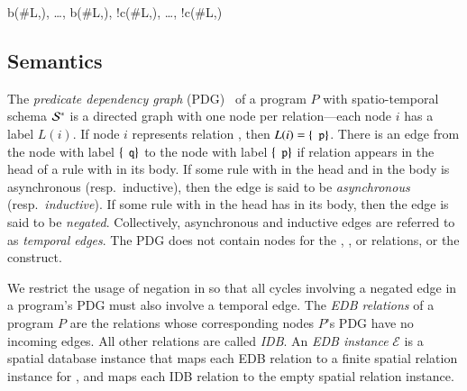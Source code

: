 \begin{Drules}
        {b(#L,), \ldots, b(#L,), !c(#L,), \ldots, !c(#L,)}
\end{Drules}





\subsection{Semantics}
\label{sec:semantics}
The {\em predicate dependency graph} (PDG)~\cite{ullmanbook} of a \lang program $P$ with spatio-temporal schema $\stschema$ is a directed graph with one node per relation---each node $i$ has a label $L(i)$.  If node $i$ represents relation , then $L(i) = \{\dedalus{p}\}$.  There is an edge from the node with label $\{\dedalus{q}\}$ to the node with label $\{\dedalus{p}\}$ if relation  appears in the head of a rule with  in its body.  If some rule with  in the head and  in the body is asynchronous (resp.\ inductive), then the edge is said to be {\em asynchronous} (resp.\ {\em inductive}).  If some rule with  in the head has  in its body, then the edge is said to be {\em negated}.  Collectively, asynchronous and inductive edges are referred to as {\em temporal edges}.  The PDG does not contain nodes for the , , or \dedalus{<} relations, or the  construct.

We restrict the usage of negation in \lang so that all cycles involving a negated edge in a \lang program's PDG must also involve a temporal edge.
The {\em EDB relations} of a \lang program $P$ are the relations whose corresponding nodes $P$'s PDG have no incoming edges.  All other relations are called {\em IDB}.
An {\em EDB instance} $\mathcal{E}$ is a spatial database instance that maps each EDB relation  to a finite spatial relation instance for , and maps each IDB relation  to the empty spatial relation instance.

